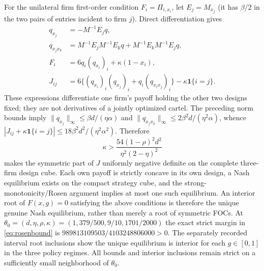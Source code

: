 For the unilateral firm first-order condition $F_i=\Pi_{i,x_i}$, let $E_j=M_{x_j}$ (it has $\beta/2$ in the two pairs of entries incident to firm $j$). Direct differentiation gives
\begin{align}\label{eq:appendixF}
q_{x_j}&=-M^{-1}E_jq,\\
q_{x_jx_k}&=M^{-1}E_jM^{-1}E_kq+M^{-1}E_kM^{-1}E_jq,\nonumber\\
F_i&=6q_i(q_{x_i})_i+\kappa(1-x_i),\nonumber\\
J_{ij}&=6\{(q_{x_i})_i(q_{x_j})_i+q_i(q_{x_ix_j})_i\}-\kappa\mathbf1\{i=j\}.\nonumber
\end{align}
These expressions differentiate one firm's payoff holding the other two designs fixed; they are not derivatives of a jointly optimized cartel. The preceding norm bounds imply $\|q_{x_j}\|_\infty\le\beta d/(\eta\alpha)$ and $\|q_{x_jx_k}\|_\infty\le2\beta^2d/(\eta^2\alpha)$, whence $|J_{ij}+\kappa\mathbf1\{i=j\}|\le18\beta^2d^2/(\eta^2\alpha^2)$. Therefore
\begin{equation}\label{eq:rosenbound}
\boxed{\ \kappa>\frac{54(1-\rho)^2d^2}{\eta^2(2-\eta)^2}\ }
\end{equation}
makes the symmetric part of $J$ uniformly negative definite on the complete three-firm design cube. Each own payoff is strictly concave in its own design, a Nash equilibrium exists on the compact strategy cube, and the strong-monotonicity/Rosen argument implies at most one such equilibrium. An interior root of $F(x,g)=0$ satisfying the above conditions is therefore the unique genuine Nash equilibrium, rather than merely a root of symmetric FOCs. At $\theta_0=(d,\eta,\rho,\kappa)=(1,379/500,9/10,1701/2000)$ the exact strict margin in \eqref{eq:rosenbound} is $989813109503/4103248806000>0$. The separately recorded interval root inclusions show the unique equilibrium is interior for each $g\in[0,1]$ in the three policy regimes. All bounds and interior inclusions remain strict on a sufficiently small neighborhood of $\theta_0$.

